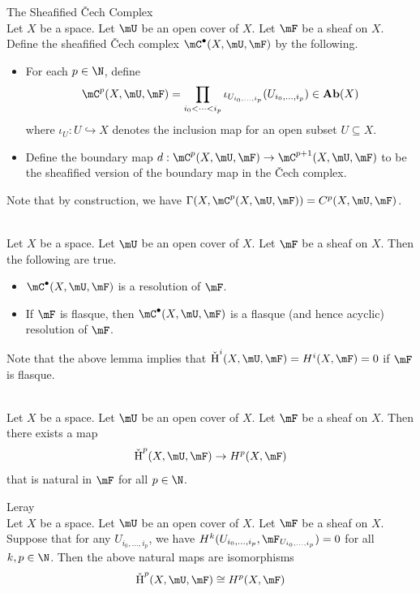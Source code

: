\documentclass[a4paper]{article}
\begin{document}
\begin{defn}{The Sheafified \v{C}ech Complex}{}\\
Let $X$ be a space. Let $\mU$ be an open cover of $X$. Let $\mF$ be a sheaf on $X$. Define the sheafified \v{C}ech complex $\mC^\bullet(X,\mU,\mF)$ by the following. 
\begin{itemize}
\item For each $p\in\N$, define $$\mC^p(X,\mU,\mF)=\prod_{i_0<\cdots<i_p}\iota_{U_{i_0,\dots,i_p}}(U_{i_0,\dots,i_p})\in\bold{Ab}(X)$$ where $\iota_U:U\hookrightarrow X$ denotes the inclusion map for an open subset $U\subseteq X$. 
\item Define the boundary map $d:\mC^p(X,\mU,\mF)\to\mC^{p+1}(X,\mU,\mF)$ to be the sheafified version of the boundary map in the \v{C}ech complex. 
\end{itemize}
\end{defn}

Note that by construction, we have $\Gamma(X,\mC^p(X,\mU,\mF))=C^p(X,\mU,\mF)$. 

\begin{lmm}{}{}\\
Let $X$ be a space. Let $\mU$ be an open cover of $X$. Let $\mF$ be a sheaf on $X$. Then the following are true. 
\begin{itemize}
\item $\mC^\bullet(X,\mU,\mF)$ is a resolution of $\mF$. 
\item If $\mF$ is flasque, then $\mC^\bullet(X,\mU,\mF)$ is a flasque (and hence acyclic) resolution of $\mF$. 
\end{itemize}
\end{lmm}

Note that the above lemma implies that $\text{\v{H}}^i(X,\mU,\mF)=H^i(X,\mF)=0$ if $\mF$ is flasque. 

\begin{lmm}{}{}\\
Let $X$ be a space. Let $\mU$ be an open cover of $X$. Let $\mF$ be a sheaf on $X$. Then there exists a map $$\text{\v{H}}^p(X,\mU,\mF)\to H^p(X,\mF)$$ that is natural in $\mF$ for all $p\in\N$. 
\end{lmm}

\begin{lmm}{Leray}{}\\
Let $X$ be a space. Let $\mU$ be an open cover of $X$. Let $\mF$ be a sheaf on $X$. Suppose that for any $U_{i_0,\dots,i_p}$, we have $H^k(U_{i_0,\dots,i_p},\mF_{U_{i_0,\dots,i_p}})=0$ for all $k,p\in\N$. Then the above natural maps are isomorphisms $$\text{\v{H}}^p(X,\mU,\mF)\cong H^p(X,\mF)$$
\end{lmm}
\end{document}
